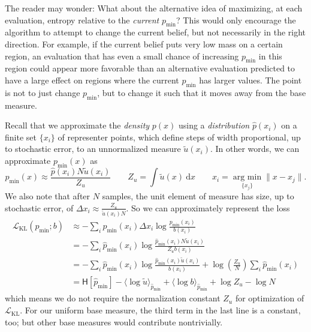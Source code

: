 \documentclass[twoside,11pt]{article}
\renewcommand{\L}{\mathcal{L}}
\renewcommand{\d}{\:\mathrm{d}}
\newcommand{\pmin}{p_{\min}}
\newcommand{\argmin}{\operatorname*{arg\: min}}
\newcommand{\KL}{\text{KL}}
\begin{document}
The reader may wonder: What about the alternative idea of maximizing,
at each evaluation, entropy relative to the \emph{current} $\pmin$?
This would only encourage the algorithm to attempt to change the
current belief, but not necessarily in the right direction. For
example, if the current belief puts very low mass on a certain region,
an evaluation that has even a small chance of increasing $\pmin$ in
this region could appear more favorable than an alternative evaluation
predicted to have a large effect on regions where the current $\pmin$
has larger values. The point is not to just change $\pmin$, but to
change it such that it moves away from the base measure.

Recall that we approximate the \emph{density} $p(x)$ using a
\emph{distribution} $\hat{p}(x_i)$ on a finite set $\{x_i\}$ of
representer points, which define steps of width proportional, up to
stochastic error, to an unnormalized measure $\tilde{u}(x_i)$. In
other words, we can approximate $\pmin(x)$ as
\begin{equation}
  \label{eq:26}
  \pmin(x) \approx \frac{\hat{p}(x_i) N \tilde{u}(x_i)}{Z_u} \qquad Z_u =
  \int \tilde{u}(x) \d x \qquad x_i = \argmin_{\{x_j\}} \| x - x_j \|.
\end{equation}
We also note that after $N$ samples, the unit element of measure has
size, up to stochastic error, of $\Delta x_i \approx
\frac{Z_u}{\tilde{u}(x_i) N}$. So we can approximately represent the
loss
\begin{equation}
  \label{eq:27}
  \begin{aligned}
    \L_{\KL}(\pmin;b) &\approx -\sum_i \pmin(x_i) \Delta x_i
    \log\frac{p_{\min}(x_i)}{b(x_i)} \\
    &= -\sum_i \hat{p}_{\min}(x_i) \log
    \frac{\hat{p}_{\min}(x_i) N \tilde{u}(x_i)}{Z_u b(x_i)} \\
    &= -\sum_i \hat{p}_{\min}(x_i) \log \frac{\hat{p}_{\min} (x_i)
      \tilde{u}(x_i)}{b(x_i)} + \log\left(\frac{Z_u}{N}\right) \sum_i \hat{p}_{\min} (x_i)\\
    &= \mathsf{H}[\hat{p}_{\min}] - \langle\log\tilde{u}\rangle_{\hat{p}_{\min}} +
    \langle \log b\rangle_{\hat{p}_{\min}} + \log Z_u - \log N
  \end{aligned}
\end{equation}
which means we do not require the normalization constant $Z_u$ for
optimization of $\L_\KL$. For our uniform base measure, the third term
in the last line is a constant, too; but other base measures would contribute
nontrivially.
\end{document}

